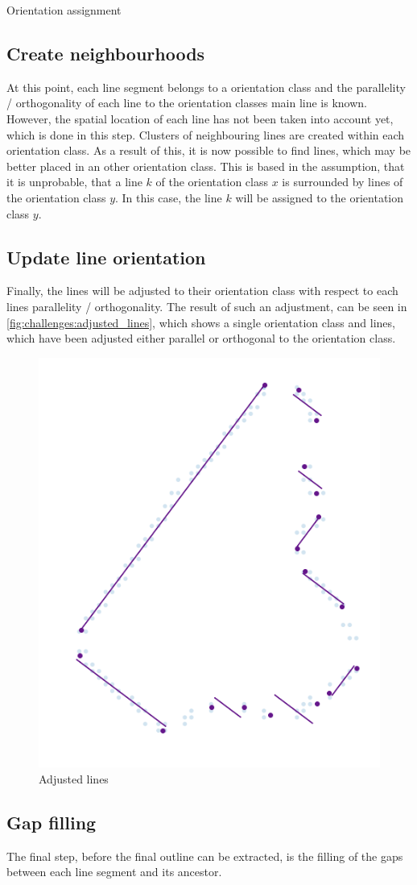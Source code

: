 \begin{algorithm}[H]
\caption{Orientation assignment}
\label{alg:challenges:define_orientations}
\end{algorithm}

\subsection{Create neighbourhoods}
At this point, each line segment belongs to a orientation class and the parallelity / orthogonality of each line to the orientation classes main line is known. However, the spatial location of each line has not been taken into account yet, which is done in this step. Clusters of neighbouring lines are created within each orientation class. As a result of this, it is now possible to find lines, which may be better placed in an other orientation class. This is based in the assumption, that it is unprobable, that a line $k$ of the orientation class $x$ is surrounded by lines of the orientation class $y$. In this case, the line $k$ will be assigned to the orientation class $y$.

\subsection{Update line orientation}
Finally, the lines will be adjusted to their orientation class with respect to each lines parallelity / orthogonality. The result of such an adjustment, can be seen in \autoref{fig:challenges:adjusted_lines}, which shows a single orientation class and lines, which have been adjusted either parallel or orthogonal to the orientation class.

\begin{figure}[H]
    \centering
	\includegraphics[width=0.4\linewidth]{chapters/challenges/images/adjusted_lines.png}
	\caption{Adjusted lines}
	\label{fig:challenges:adjusted_lines}
\end{figure}

\subsection{Gap filling}
The final step, before the final outline can be extracted, is the filling of the gaps between each line segment and its ancestor.